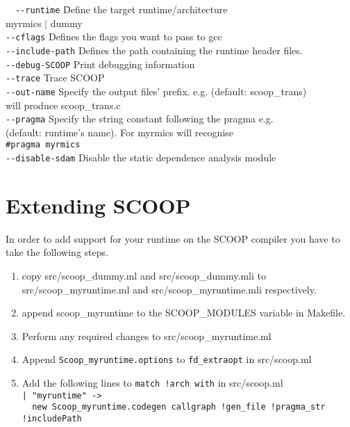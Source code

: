 \documentclass[
a4paper,
12pt,
]{article}
\begin{document}
  \begin{tabbing}
  \ \ \=\verb!--runtime!\hspace{4em} \=Define the target runtime/architecture\\
                                    \>\>myrmics $|$ dummy\\[1ex]
  \>\verb!--cflags!                   \>Defines the flags you want to pass to gcc\\[1ex]
  \>\verb!--include-path!             \>Defines the path containing the runtime header files.\\[1ex]
  \>\verb!--debug-SCOOP!              \>Print debugging information\\[1ex]
  \>\verb!--trace!                    \>Trace SCOOP\\[1ex]
  \>\verb!--out-name!                 \>Specify the output files' prefix. e.g. (default: scoop\_trans)\\
                                    \>\>will produce scoop\_trans.c\\[1ex]
  \>\verb!--pragma!                   \>Specify the string constant following the pragma e.g.\\
                                    \>\>(default: runtime's name). For myrmics will recognise\\
                                    \>\>\verb!#pragma myrmics!\\[1ex]
  \>\verb!--disable-sdam!             \>Disable the static dependence analysis module
  \end{tabbing}

\section{Extending SCOOP}

In order to add support for your runtime on the SCOOP compiler you
have to take the following steps.

\begin{enumerate}
  \item copy src/scoop\_dummy.ml and src/scoop\_dummy.mli to
    src/scoop\_myruntime.ml and src/scoop\_myruntime.mli respectively.
  \item append scoop\_myruntime to the SCOOP\_MODULES variable in
    Makefile.
  \item Perform any required changes to src/scoop\_myruntime.ml
  \item Append \verb!Scoop_myruntime.options! to \verb!fd_extraopt! in
    src/scoop.ml
  \item Add the following lines to \verb~match !arch with~ in src/scoop.ml\\
    \verb~| "myruntime" ->~\\
    \verb~  new Scoop_myruntime.codegen callgraph !gen_file !pragma_str !includePath~
\end{enumerate}
\end{document}
